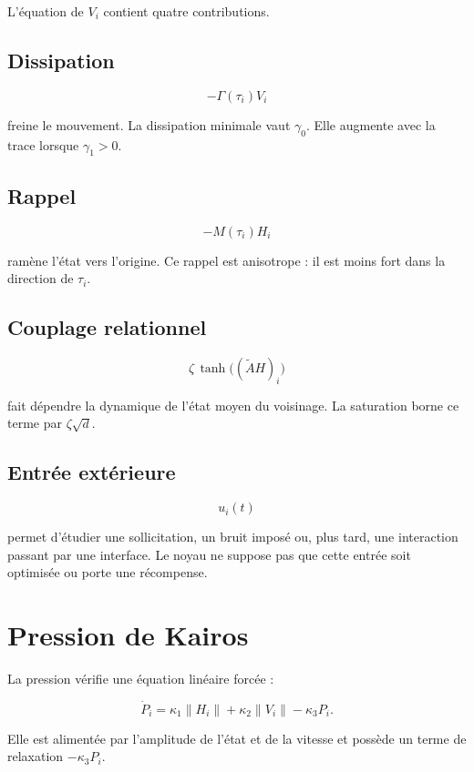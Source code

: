 L'équation de \(V_i\) contient quatre contributions.

\subsection{Dissipation}\label{t1-dissipation}

\[
-\Gamma(\tau_i)V_i
\]

freine le mouvement. La dissipation minimale vaut \(\gamma_0\). Elle augmente avec la trace lorsque \(\gamma_1>0\).

\subsection{Rappel}\label{t1-rappel}

\[
-M(\tau_i)H_i
\]

ramène l'état vers l'origine. Ce rappel est anisotrope : il est moins fort dans la direction de \(\tau_i\).

\subsection{Couplage relationnel}\label{t1-couplage-relationnel}


\[
\zeta\,\tanh\!\bigl((\widetilde A H)_i\bigr)
\]

fait dépendre la dynamique de l'état moyen du voisinage. La saturation borne ce terme par \(\zeta\sqrt d\).

\subsection{Entrée extérieure}\label{t1-entree-exterieure}

\[
u_i(t)
\]

permet d'étudier une sollicitation, un bruit imposé ou, plus tard, une interaction passant par une interface. Le noyau ne suppose pas que cette entrée soit optimisée ou porte une récompense.

\section{Pression de Kairos}\label{t1-pression-de-kairos}

La pression vérifie une équation linéaire forcée :

\[
\dot P_i
=
\kappa_1\|H_i\|
+
\kappa_2\|V_i\|
-
\kappa_3P_i.
\]

Elle est alimentée par l'amplitude de l'état et de la vitesse et possède un terme de relaxation \(-\kappa_3P_i\).

